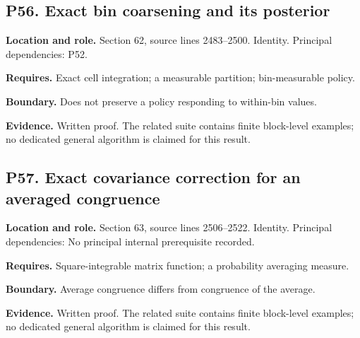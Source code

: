 \documentclass[11pt,letterpaper]{article}
\begin{document}
\par\noindent\begin{minipage}{\textwidth}
\subsection{P56. Exact bin coarsening and its
posterior}\label{p56.-exact-bin-coarsening-and-its-posterior}

\textbf{Location and role.} Section 62, source lines 2483--2500.
Identity. Principal dependencies: P52.

\textbf{Requires.} Exact cell integration; a measurable partition;
bin-measurable policy.

\textbf{Boundary.} Does not preserve a policy responding to within-bin
values.

\textbf{Evidence.} Written proof. The related suite contains finite
block-level examples; no dedicated general algorithm is claimed for this
result.
\end{minipage}\par\medskip

\par\noindent\begin{minipage}{\textwidth}
\subsection{P57. Exact covariance correction for an averaged
congruence}\label{p57.-exact-covariance-correction-for-an-averaged-congruence}

\textbf{Location and role.} Section 63, source lines 2506--2522.
Identity. Principal dependencies: No principal internal prerequisite
recorded.

\textbf{Requires.} Square-integrable matrix function; a probability
averaging measure.

\textbf{Boundary.} Average congruence differs from congruence of the
average.

\textbf{Evidence.} Written proof. The related suite contains finite
block-level examples; no dedicated general algorithm is claimed for this
result.
\end{minipage}\par\medskip
\end{document}
